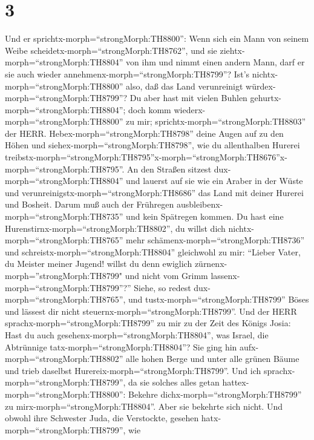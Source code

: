 \hypertarget{section-2}{%
\section{3}\label{section-2}}

 Und er sprichtx-morph=``strongMorph:TH8800'': Wenn sich ein
Mann von seinem Weibe scheidetx-morph=``strongMorph:TH8762'', und sie
ziehtx-morph=``strongMorph:TH8804'' von ihm und nimmt einen andern Mann,
darf er sie auch wieder annehmenx-morph=``strongMorph:TH8799''? Ist's
nichtx-morph=``strongMorph:TH8800'' also, daß das Land verunreinigt
würdex-morph=``strongMorph:TH8799''? Du aber hast mit vielen Buhlen
gehurtx-morph=``strongMorph:TH8804''; doch komm
wiederx-morph=``strongMorph:TH8800'' zu mir;
sprichtx-morph=``strongMorph:TH8803'' der HERR. 
Hebex-morph=``strongMorph:TH8798'' deine Augen auf zu den Höhen und
siehex-morph=``strongMorph:TH8798'', wie du allenthalben Hurerei
treibstx-morph=``strongMorph:TH8795''\textbar x-morph=``strongMorph:TH8676''x-morph=``strongMorph:TH8795''.
An den Straßen sitzest dux-morph=``strongMorph:TH8804'' und lauerst auf
sie wie ein Araber in der Wüste und
verunreinigstx-morph=``strongMorph:TH8686'' das Land mit deiner Hurerei
und Bosheit.  Darum muß auch der Frühregen
ausbleibenx-morph=``strongMorph:TH8735'' und kein Spätregen kommen. Du
hast eine Hurenstirnx-morph=``strongMorph:TH8802'', du willst dich
nichtx-morph=``strongMorph:TH8765'' mehr
schämenx-morph=``strongMorph:TH8736''  und
schreistx-morph=``strongMorph:TH8804'' gleichwohl zu mir: ``Lieber
Vater, du Meister meiner Jugend!  willst du denn ewiglich
zürnenx-morph=''strongMorph:TH8799" und nicht vom Grimm
lassenx-morph=``strongMorph:TH8799''?'' Siehe, so redest
dux-morph=``strongMorph:TH8765'', und tustx-morph=``strongMorph:TH8799''
Böses und lässest dir nicht steuernx-morph=``strongMorph:TH8799''.
 Und der HERR sprachx-morph=``strongMorph:TH8799'' zu mir zu
der Zeit des Königs Josia: Hast du auch
gesehenx-morph=``strongMorph:TH8804'', was Israel, die Abtrünnige
tatx-morph=``strongMorph:TH8804''? Sie ging hin
aufx-morph=``strongMorph:TH8802'' alle hohen Berge und unter alle grünen
Bäume und trieb daselbst Hurereix-morph=``strongMorph:TH8799''.
 Und ich sprachx-morph=``strongMorph:TH8799'', da sie
solches alles getan hattex-morph=``strongMorph:TH8800'': Bekehre
dichx-morph=``strongMorph:TH8799'' zu mirx-morph=``strongMorph:TH8804''.
Aber sie bekehrte sich nicht. Und obwohl ihre Schwester Juda, die
Verstockte, gesehen hatx-morph=``strongMorph:TH8799'',  wie
